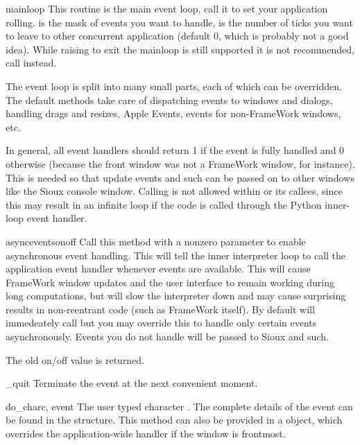 \begin{funcdesc}{mainloop}{}
This routine is the main event loop, call it to set your application
rolling.  is the mask of events you want to handle,
 is the number of ticks you want to leave to other
concurrent application (default 0, which is probably not a good
idea). While raising  to exit the mainloop is still
supported it is not recommended, call  instead.

The event loop is split into many small parts, each of which can be
overridden. The default methods take care of dispatching events to
windows and dialogs, handling drags and resizes, Apple Events, events
for non-FrameWork windows, etc.

In general, all event handlers should return 1 if the event is fully
handled and 0 otherwise (because the front window was not a FrameWork
window, for instance). This is needed so that update events and such
can be passed on to other windows like the Sioux console window.
Calling  is not allowed within 
or its callees, since this may result in an infinite loop if the
code is called through the Python inner-loop event handler.
\end{funcdesc}

\begin{funcdesc}{asyncevents}{onoff}
Call this method with a nonzero parameter to enable
asynchronous event handling. This will tell the inner interpreter loop
to call the application event handler  whenever events
are available. This will cause FrameWork window updates and the user
interface to remain working during long computations, but will slow the
interpreter down and may cause surprising results in non-reentrant code
(such as FrameWork itself). By default  will immedeately
call  but you may override this to handle only certain
events asynchronously. Events you do not handle will be passed to Sioux
and such.

The old on/off value is returned.
\end{funcdesc}

\begin{funcdesc}{_quit}{}
Terminate the event  at the next convenient moment.
\end{funcdesc}

\begin{funcdesc}{do_char}{c, event}
The user typed character . The complete details of the event
can be found in the  structure. This method can also be
provided in a  object, which overrides the
application-wide handler if the window is frontmost.
\end{funcdesc}

